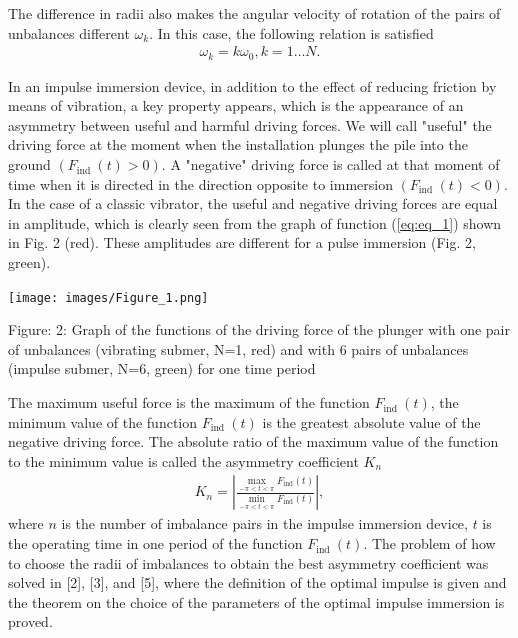 \documentclass[
11pt,%
tightenlines,%
twoside,%
onecolumn,%
nofloats,%
nobibnotes,%
nofootinbib,%
superscriptaddress,%
noshowpacs,%
centertags]%
{revtex4}
\begin{document}
The difference in radii also makes the angular velocity  of rotation
of the pairs of unbalances different $\omega_{k}$. In this case, the
following relation is satisfied
\begin{eqnarray}
\omega_{k}=k \omega_{0}, k=1 \ldots N. \label{eq:eq_2}
\end{eqnarray}

In an impulse immersion device, in addition  to the effect of
reducing friction by means of vibration, a key property appears,
which is the appearance of an asymmetry between useful and harmful
driving forces. We will call "useful" the driving force at the
moment when the installation plunges the pile into the ground
$\left(F_{\text {ind }}(t)>0\right)$. A "negative" driving force is
called at that moment of time when it is directed in the direction
opposite to immersion $\left(F_{\text {ind }}(t)<0\right)$. In the
case of a classic vibrator, the useful and negative driving forces
are equal in amplitude, which is clearly seen from the graph of
function (\ref{eq:eq_1}) shown in Fig. 2 (red). These amplitudes are
different for a pulse immersion (Fig. 2, green).
\begin{center}
\texttt{[image: images/Figure\_1.png]}
\end{center}
Figure: 2: Graph of the functions of the driving force of the
plunger with one pair of unbalances (vibrating submer, N=1, red) and
with 6 pairs of unbalances (impulse submer, N=6, green) for one time
period


The maximum useful force is the maximum of  the function $F_{\text
{ind }}(t)$, the minimum value of the function $F_{\text {ind }}(t)$
is the greatest absolute value of the negative driving force. The
absolute ratio of the maximum value of the function to the minimum
value is called the asymmetry coefficient $K_n$
\begin{eqnarray*}
K_n = \left| \frac{ \max\limits_{-\pi<t<\pi} F_\text{ind}(t)}{\min\limits_{-\pi<t<\pi}
F_\text{ind}(t)}\right|,
\end{eqnarray*}
where $n$ is the number of imbalance pairs in the impulse immersion
device, $t$ is the operating time in one period of the function
$F_{\text {ind }}(t)$. The problem of how to choose the radii of
imbalances to obtain the best asymmetry coefficient was solved in
[2], [3], and  [5], where the definition of the optimal impulse is
given and the theorem on the choice of the parameters of the optimal
impulse immersion is proved.
\end{document}
